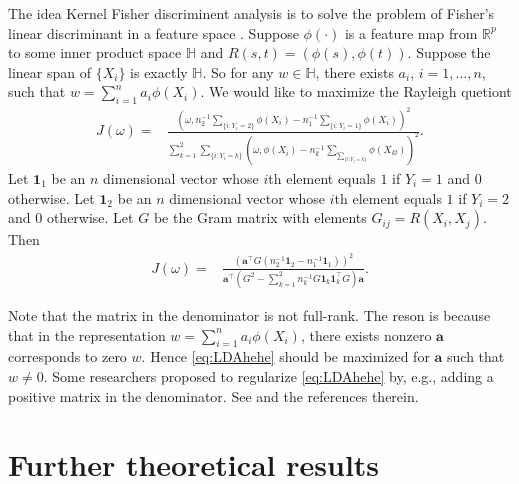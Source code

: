 \documentclass[11pt]{article}
\newcommand{\Ba}{\mathbf{a}}    \newcommand{\Bb}{\mathbf{b}}    \newcommand{\Bc}{\mathbf{c}}    \newcommand{\Bd}{\mathbf{d}}    \newcommand{\Be}{\mathbf{e}}    \newcommand{\Bf}{\mathbf{f}}    \newcommand{\Bg}{\mathbf{g}}    \newcommand{\Bh}{\mathbf{h}}    \newcommand{\Bi}{\mathbf{i}}    \newcommand{\Bj}{\mathbf{j}}    \newcommand{\Bk}{\mathbf{k}}    \newcommand{\Bl}{\mathbf{l}}
\theoremstyle{plain}
\theoremstyle{definition}
\theoremstyle{remark}
\begin{document}
The idea Kernel Fisher discriminent analysis is to solve the problem of Fisher's linear discriminant in a feature space \cite{914517}.
Suppose $\phi(\cdot)$ is a feature map from $\mathbb R^p$ to some inner product space $\mathbb H$ and $R(s,t)=(\phi(s),\phi(t))$.
Suppose the linear span of $\{X_{i}\}$ is exactly $\mathbb H$.
So for any $w\in \mathbb H$, there exists $a_i$, $i=1,\ldots,n$, such that $w=\sum_{i=1}^{n} a_{i} \phi(X_{i})$.
We would like to maximize the Rayleigh quetiont
\begin{equation*}
    \begin{split}
    J(\omega)=
    &
    \frac{
        \displaystyle
        \left(\omega , n_2^{-1} \sum_{\{i:Y_i=2\}}\phi (X_{i}) -n_1^{-1}\sum_{\{i: Y_i = 1\}}\phi (X_{i})\right)^2
    }
    {
        \displaystyle
        \sum_{k=1}^2 \sum_{\{i:Y_i=k\}} \left(
            \omega, \phi(X_{i})
            -n_k^{-1}\sum_{\sum_{\{l:Y_l=k\}}} \phi(X_{kl})
        \right)^2
    }
    .
    \end{split}
\end{equation*}
Let $\mathbf 1_{1}$ be an $n$ dimensional vector whose $i$th element equals $1$ if $Y_{i}=1$ and $0$ otherwise.
Let $\mathbf 1_{2}$ be an $n$ dimensional vector whose $i$th element equals $1$ if $Y_{i}=2$ and $0$ otherwise.
Let $G$ be the Gram matrix with elements $G_{ij}=R(X_i,X_j)$.
Then
\begin{equation}\label{eq:LDAhehe}
    \begin{split}
    J(\omega)=&
    \frac{
        \displaystyle
        \left(
            \Ba^\top G
            \left(n_2^{-1}\mathbf 1_2 -n_1^{-1}\mathbf 1_1\right)
        \right)^2
    }
    {
        \displaystyle
    \Ba^\top \left(G^2   - \sum_{k=1}^2 n_k^{-1}G \mathbf 1_k \mathbf 1_k^\top G \right) \Ba 
    }
    .
    \end{split}
\end{equation}

Note that the matrix in the denominator is not full-rank.
The reson is because that in the representation $w=\sum_{i=1}^{n} a_{i} \phi(X_{i})$, there exists nonzero $\Ba$ corresponds to zero $w$.
Hence \eqref{eq:LDAhehe} should be maximized for $\Ba$ such that $w\neq 0$.
Some researchers proposed to regularize \eqref{eq:LDAhehe} by, e.g., adding a positive matrix in the denominator. See \cite{914517} and the references therein.



\section{Further theoretical results}
\end{document}
